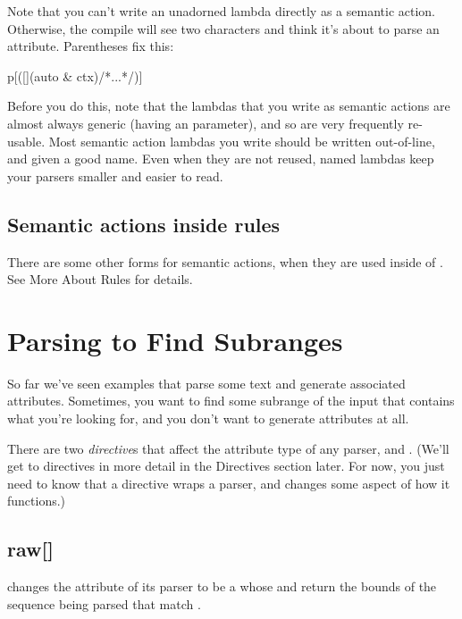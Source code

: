 \documentclass{MyBook}
\begin{document}
Note that you can't write an unadorned lambda directly as a semantic action. Otherwise, the compile will see two \ci{'{}{[}'{}} characters and think it's about to parse an attribute. Parentheses fix this:

\begin{code}
p[([](auto & ctx){/*...*/})]
\end{code}

Before you do this, note that the lambdas that you write as semantic actions are almost always generic (having an  parameter), and so are very frequently re-usable. Most semantic action lambdas you write should be written out-of-line, and given a good name. Even when they are not reused, named lambdas keep your parsers smaller and easier to read.



\subsection{Semantic actions inside rules}

There are some other forms for semantic actions, when they are used inside of . See More About Rules for details.

\section{Parsing to Find Subranges}

So far we've seen examples that parse some text and generate associated attributes. Sometimes, you want to find some subrange of the input that contains what you're looking for, and you don't want to generate attributes at all.

There are two \emph{directive}s that affect the attribute type of any parser,  and . (We'll get to directives in more detail in the Directives section later. For now, you just need to know that a directive wraps a parser, and changes some aspect of how it functions.)

\subsection{raw{[}{]}}

 changes the attribute of its parser to be a  whose  and  return the bounds of the sequence being parsed that match .
\end{document}
